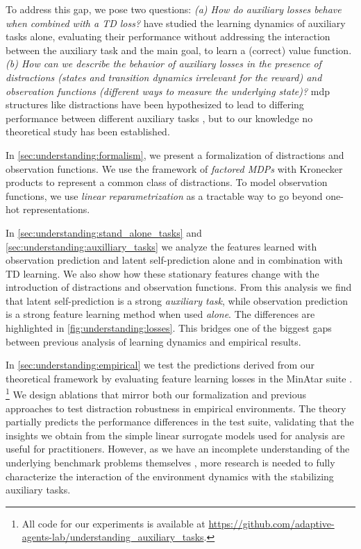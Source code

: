 To address this gap, we pose two questions: \emph{(a) How do auxiliary losses behave when combined with a TD loss?} \textcite{tang2022understanding,lelan2022generalization,tang2023towards} have studied the learning dynamics of auxiliary tasks alone, evaluating their performance without addressing the interaction between the auxiliary task and the main goal, to learn a (correct) value function. \emph{(b) How can we describe the behavior of auxiliary losses in the presence of distractions (states and transition dynamics irrelevant for the reward) and observation functions (different ways to measure the underlying state)?} \ac{mdp}  structures like distractions have been hypothesized to lead to differing performance between different auxiliary tasks \parencite{ni2024bridging}, but to our knowledge no theoretical study has been established.


In \autoref{sec:understanding:formalism}, we present a formalization of distractions and observation functions. We use the framework of \emph{factored MDPs} \parencite{boutilier2000stochastic} with Kronecker products \parencite{mahadevan2009learning} to represent a common class of distractions. To model observation functions, we use \emph{linear reparametrization} as a tractable way to go beyond one-hot representations. 

In \autoref{sec:understanding:stand_alone_tasks} and \autoref{sec:understanding:auxilliary_tasks} we analyze the features learned with observation prediction and latent self-prediction alone and in combination with TD learning. 
We also show how these stationary features change with the introduction of distractions and observation functions.
From this analysis we find that latent self-prediction is a strong \emph{auxiliary task}, while observation prediction is a strong feature learning method when used \emph{alone}.
The differences are highlighted in \autoref{fig:understanding:losses}.
This bridges one of the biggest gaps between previous analysis of learning dynamics and empirical results.

In \autoref{sec:understanding:empirical} we test the predictions derived from our theoretical framework by evaluating feature learning losses in the MinAtar suite \parencite{young19minatar}.
\footnote{All code for our experiments is available at \url{https://github.com/adaptive-agents-lab/understanding_auxiliary_tasks}.}
We design ablations that mirror both our formalization and previous approaches to test distraction robustness in empirical environments. 
The theory partially predicts the performance differences in the test suite, validating that the insights we obtain from the simple linear surrogate models used for analysis are useful for practitioners.
However, as we have an incomplete understanding of the underlying benchmark problems themselves \parencite{voelcker2024can}, more research is needed to fully characterize the interaction of the environment dynamics with the stabilizing auxiliary tasks.

